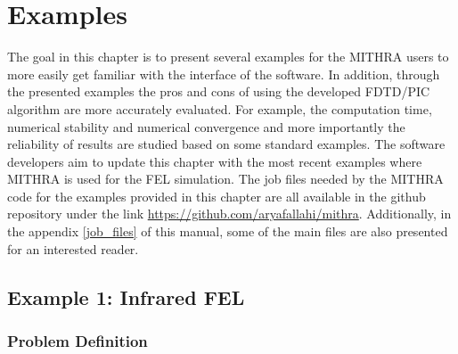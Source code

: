 \chapter{Examples}
\label{chapter_examples}

The goal in this chapter is to present several examples for the MITHRA users to more easily get familiar with the interface of the software.
%
In addition, through the presented examples the pros and cons of using the developed FDTD/PIC algorithm are more accurately evaluated.
%
For example, the computation time, numerical stability and numerical convergence and more importantly the reliability of results are studied based on some standard examples.
%
The software developers aim to update this chapter with the most recent examples where MITHRA is used for the FEL simulation.
%
The job files needed by the MITHRA code for the examples provided in this chapter are all available in the github repository under the link \href{https://github.com/aryafallahi/mithra}{https://github.com/aryafallahi/mithra}.
%
Additionally, in the appendix \ref{job_files} of this manual, some of the main files are also presented for an interested reader. 

\section{Example 1: Infrared FEL}

\subsection{Problem Definition}

